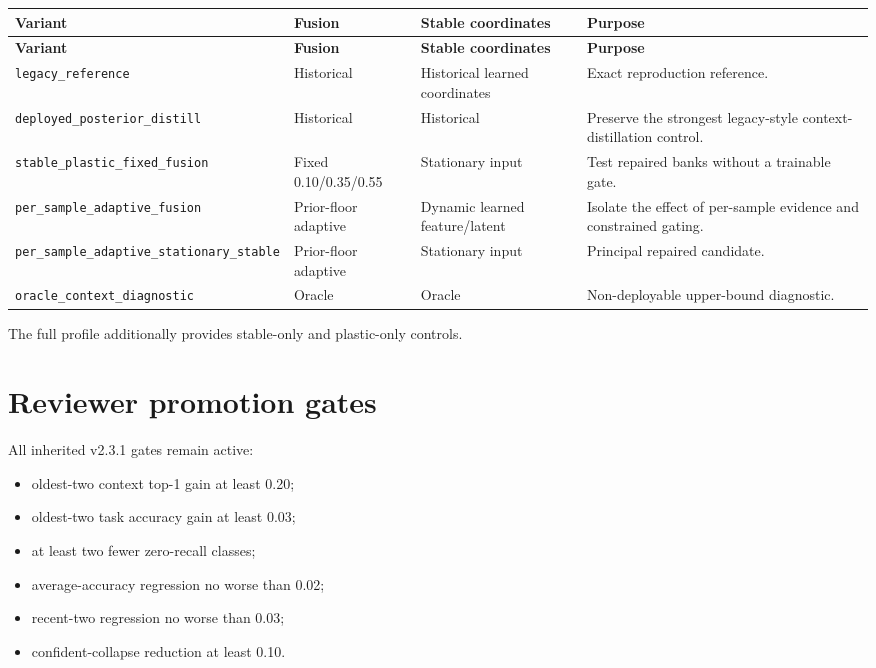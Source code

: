 \documentclass[11pt,a4paper]{article}
\newcommand{\code}[1]{\texttt{#1}}
\begin{document}
\begin{longtable}{p{4.1cm}p{2.6cm}p{3.1cm}p{4.2cm}}
\toprule
\textbf{Variant} & \textbf{Fusion} & \textbf{Stable coordinates} & \textbf{Purpose} \\
\midrule
\endfirsthead
\toprule
\textbf{Variant} & \textbf{Fusion} & \textbf{Stable coordinates} & \textbf{Purpose} \\
\midrule
\endhead
\code{legacy\_reference} & Historical & Historical learned coordinates & Exact reproduction reference. \\
\code{deployed\_posterior\_distill} & Historical & Historical & Preserve the strongest legacy-style context-distillation control. \\
\code{stable\_plastic\_fixed\_fusion} & Fixed 0.10/0.35/0.55 & Stationary input & Test repaired banks without a trainable gate. \\
\code{per\_sample\_adaptive\_fusion} & Prior-floor adaptive & Dynamic learned feature/latent & Isolate the effect of per-sample evidence and constrained gating. \\
\code{per\_sample\_adaptive\_stationary\_stable} & Prior-floor adaptive & Stationary input & Principal repaired candidate. \\
\code{oracle\_context\_diagnostic} & Oracle & Oracle & Non-deployable upper-bound diagnostic. \\
\bottomrule
\end{longtable}

The full profile additionally provides stable-only and plastic-only controls.

\section{Reviewer promotion gates}

All inherited v2.3.1 gates remain active:

\begin{itemize}[leftmargin=1.5em]
\item oldest-two context top-1 gain at least 0.20;
\item oldest-two task accuracy gain at least 0.03;
\item at least two fewer zero-recall classes;
\item average-accuracy regression no worse than 0.02;
\item recent-two regression no worse than 0.03;
\item confident-collapse reduction at least 0.10.
\end{itemize}
\end{document}
